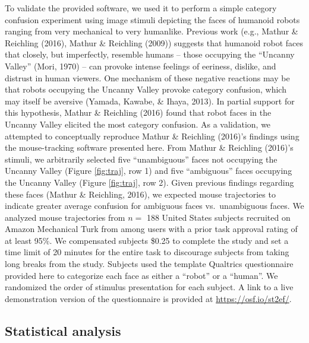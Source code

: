 \documentclass[]{article}
\begin{document}
To validate the provided software, we used it to perform a simple
category confusion experiment using image stimuli depicting the faces of
humanoid robots ranging from very mechanical to very humanlike. Previous
work (e.g., Mathur \& Reichling (2016), Mathur \& Reichling (2009))
suggests that humanoid robot faces that closely, but imperfectly,
resemble humans -- those occupying the ``Uncanny Valley'' (Mori, 1970)
-- can provoke intense feelings of eeriness, dislike, and distrust in
human viewers. One mechanism of these negative reactions may be that
robots occupying the Uncanny Valley provoke category confusion, which
may itself be aversive (Yamada, Kawabe, \& Ihaya, 2013). In partial
support for this hypothesis, Mathur \& Reichling (2016) found that robot
faces in the Uncanny Valley elicited the most category confusion. As a
validation, we attempted to conceptually reproduce Mathur \& Reichling
(2016)'s findings using the mouse-tracking software presented here. From
Mathur \& Reichling (2016)'s stimuli, we arbitrarily selected five
``unambiguous'' faces not occupying the Uncanny Valley (Figure
\ref{fig:traj}, row 1) and five ``ambiguous'' faces occupying the
Uncanny Valley (Figure \ref{fig:traj}, row 2). Given previous findings
regarding these faces (Mathur \& Reichling, 2016), we expected mouse
trajectories to indicate greater average confusion for ambiguous faces
vs.~unambiguous faces. We analyzed mouse trajectories from \(n =\) 188
United States subjects recruited on Amazon Mechanical Turk from among
users with a prior task approval rating of at least 95\%. We compensated
subjects \$0.25 to complete the study and set a time limit of 20 minutes
for the entire task to discourage subjects from taking long breaks from
the study. Subjects used the template Qualtrics questionnaire provided
here to categorize each face as either a ``robot'' or a ``human''. We
randomized the order of stimulus presentation for each subject. A link
to a live demonstration version of the questionnaire is provided at
\url{https://osf.io/st2ef/}.

\subsection{Statistical analysis}
\end{document}
